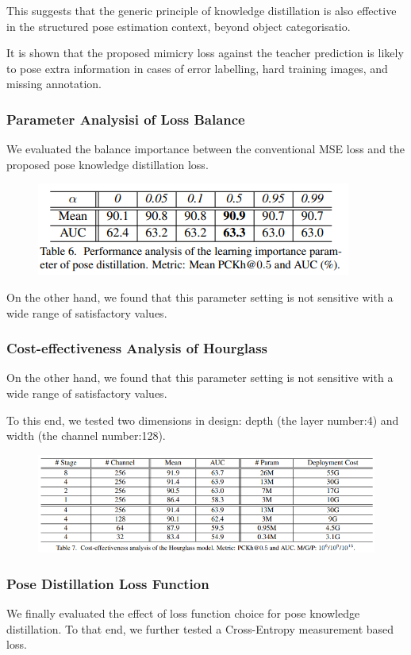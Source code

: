 \documentclass[11pt]{article}
\begin{document}
This suggests that the generic principle of knowledge distillation is also effective in the structured pose estimation context, beyond object categorisatio.

It is shown that the proposed mimicry loss against the teacher prediction is likely to pose extra information in cases of error labelling, hard training images, and missing annotation.

\subsubsection{Parameter Analysisi of Loss Balance}
We evaluated the balance importance between the conventional MSE loss and the proposed pose knowledge distillation loss.

\begin{figure}[H]
	\centering
	\includegraphics[scale = 0.5]{75}
\end{figure}

On the other hand, we found that this parameter setting is not sensitive with a wide range of satisfactory values.

\subsubsection{Cost-effectiveness Analysis of Hourglass}
On the other hand, we found that this parameter setting is not sensitive with a wide range of satisfactory values.

To this end, we tested two dimensions in design: depth (the layer number:4) and width (the channel number:128).

\begin{figure}[H]
	\centering
	\includegraphics[scale = 0.5]{76}
\end{figure}
\subsubsection{Pose Distillation Loss Function}
We finally evaluated the effect of loss function choice for pose knowledge distillation. To that end, we further tested a Cross-Entropy measurement based loss.
\end{document}
